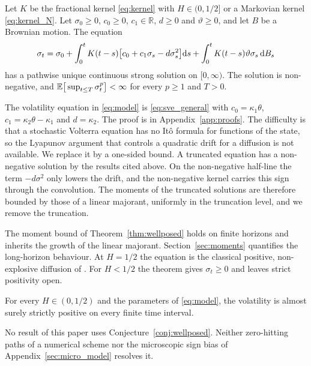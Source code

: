 \begin{theorem}\label{thm:wellposed}
Let $K$ be the fractional kernel \eqref{eq:kernel} with $H\in(0,1/2]$ or a Markovian kernel \eqref{eq:kernel_N}. Let $\sigma_0\ge0$, $c_0\ge0$, $c_1\in\mathbb R$, $d\ge0$ and $\vartheta\ge0$, and let $B$ be a Brownian motion. The equation
\begin{equation}\label{eq:sve_general}
\sigma_t=\sigma_0+\int_0^tK(t-s)\big[c_0+c_1\sigma_s-d\sigma_s^2\big]\D s+\int_0^tK(t-s)\vartheta\sigma_s\,\D B_s
\end{equation}
has a pathwise unique continuous strong solution on $[0,\infty)$. The solution is non-negative, and $\mathbb{E}\big[\sup_{t\le T}\sigma_t^p\big]<\infty$ for every $p\ge1$ and $T>0$.
\end{theorem}

The volatility equation in \eqref{eq:model} is \eqref{eq:sve_general} with $c_0=\kappa_1\theta$, $c_1=\kappa_2\theta-\kappa_1$ and $d=\kappa_2$. The proof is in Appendix~\ref{app:proofs}. The difficulty is that a stochastic Volterra equation has no It\^o formula for functions of the state, so the Lyapunov argument that controls a quadratic drift for a diffusion is not available. We replace it by a one-sided bound. A truncated equation has a non-negative solution by the results cited above. On the non-negative half-line the term $-d\sigma^2$ only lowers the drift, and the non-negative kernel carries this sign through the convolution. The moments of the truncated solutions are therefore bounded by those of a linear majorant, uniformly in the truncation level, and we remove the truncation.

The moment bound of Theorem~\ref{thm:wellposed} holds on finite horizons and inherits the growth of the linear majorant. Section~\ref{sec:moments} quantifies the long-horizon behaviour. At $H=1/2$ the equation is the classical positive, non-explosive diffusion of \citet{SeppRakhmonov2023}. For $H<1/2$ the theorem gives $\sigma_t\ge0$ and leaves strict positivity open.

\begin{conjecture}\label{conj:wellposed}
For every $H\in(0,1/2)$ and the parameters of \eqref{eq:model}, the volatility is almost surely strictly positive on every finite time interval.
\end{conjecture}

No result of this paper uses Conjecture~\ref{conj:wellposed}. Neither zero-hitting paths of a numerical scheme nor the microscopic sign bias of Appendix~\ref{sec:micro_model} resolves it.

